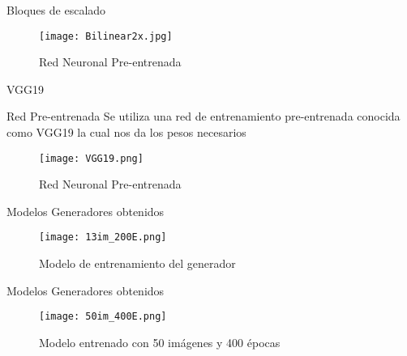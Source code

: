 \begin{frame}{Bloques de escalado}
    \begin{figure}[H]
        \begin{center}
          \texttt{[image: Bilinear2x.jpg]}
          \caption{Red Neuronal Pre-entrenada}
          \label{Alexis5}
        \end{center}
    \end{figure}
     
\end{frame}

\begin{frame}{VGG19}
    
\begin{block}{Red Pre-entrenada}
    Se utiliza una red de entrenamiento pre-entrenada conocida como VGG19
    la cual nos da los pesos necesarios
\end{block}
    \begin{figure}[H]
        \begin{center}
          \texttt{[image: VGG19.png]}
          \caption{Red Neuronal Pre-entrenada}
          \label{Alexis5}
        \end{center}
    \end{figure}
     

\end{frame}


\begin{frame}{Modelos Generadores obtenidos}
    
    \begin{figure}[H]
        \begin{center}
          \texttt{[image: 13im\_200E.png]}
          \caption{Modelo de entrenamiento del generador}
          \label{Alexis6}
        \end{center}
    \end{figure}
    
\end{frame}

\begin{frame}{Modelos Generadores obtenidos}
    
    \begin{figure}[H]
        \begin{center}
          \texttt{[image: 50im\_400E.png]}
          \caption{Modelo entrenado con 50 imágenes y 400 épocas}
          \label{Alexis7}
        \end{center}
    \end{figure}
     
\end{frame}


